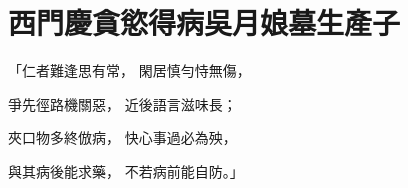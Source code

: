 %

\chapter{西門慶貪慾得病\KG 吳月娘墓生產子}


\begin{showcontents}{}



「仁者難逢思有常，  閑居慎勻恃無傷，

爭先徑路機關惡，  近後語言滋味長；

夾口物多終倣病，  快心事過必為殃，

與其病後能求藥，  不若病前能自防。」


\end{showcontents}
